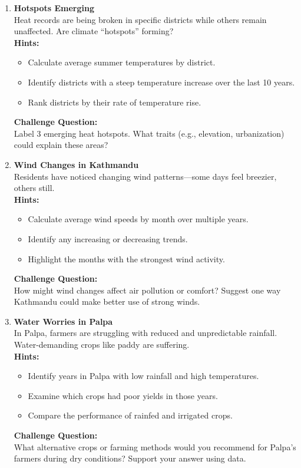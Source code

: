 \begin{enumerate}
  \item \textbf{Hotspots Emerging} \\
  Heat records are being broken in specific districts while others remain unaffected. Are climate “hotspots” forming? \\
  \textbf{Hints:}
  \begin{itemize}
    \item Calculate average summer temperatures by district.
    \item Identify districts with a steep temperature increase over the last 10 years.
    \item Rank districts by their rate of temperature rise.
  \end{itemize}
  \textbf{Challenge Question:} \\
  Label 3 emerging heat hotspots. What traits (e.g., elevation, urbanization) could explain these areas?

  \item \textbf{Wind Changes in Kathmandu} \\
  Residents have noticed changing wind patterns—some days feel breezier, others still. \\
  \textbf{Hints:}
  \begin{itemize}
    \item Calculate average wind speeds by month over multiple years.
    \item Identify any increasing or decreasing trends.
    \item Highlight the months with the strongest wind activity.
  \end{itemize}
  \textbf{Challenge Question:} \\
  How might wind changes affect air pollution or comfort? Suggest one way Kathmandu could make better use of strong winds.

  \item \textbf{Water Worries in Palpa} \\
  In Palpa, farmers are struggling with reduced and unpredictable rainfall. Water-demanding crops like paddy are suffering. \\
  \textbf{Hints:}
  \begin{itemize}
    \item Identify years in Palpa with low rainfall and high temperatures.
    \item Examine which crops had poor yields in those years.
    \item Compare the performance of rainfed and irrigated crops.
  \end{itemize}
  \textbf{Challenge Question:} \\
  What alternative crops or farming methods would you recommend for Palpa’s farmers during dry conditions? Support your answer using data.

\end{enumerate}
